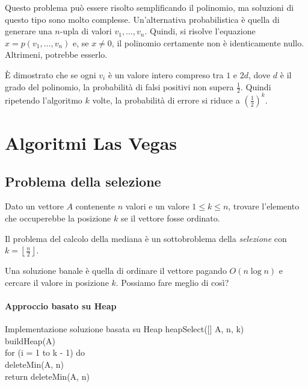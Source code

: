 \noindent
Questo problema può essere risolto semplificando il polinomio, ma soluzioni
di questo tipo sono molto complesse. Un'alternativa probabilistica è quella
di generare una $n$-upla di valori $v_1,\dots,v_n$. Quindi, si risolve
l'equazione $x=p(v_1,\dots,v_n)$ e, se $x\neq 0$, il polinomio certamente
non è identicamente nullo. Altrimeni, potrebbe esserlo.

È dimostrato che se ogni $v_i$ è un valore intero compreso tra $1$ e $2d$,
dove $d$ è il grado del polinomio, la probabilità di falsi positivi non
supera $\frac{1}{2}$. Quindi ripetendo l'algoritmo $k$ volte, la
probabilità di errore si riduce a $\left(\frac{1}{2}\right)^k$.

\section{Algoritmi Las Vegas}
\subsection{Problema della selezione}
\begin{problem}
    Dato un vettore $A$ contenente $n$ valori e un valore $1\leq k\leq n$,
    trovare l'elemento che occuperebbe la posizione $k$ se il vettore fosse
    ordinato.
\end{problem}
\begin{note}
    Il problema del calcolo della mediana è un sottobroblema della
    \emph{selezione} con $k=\left\lfloor\frac{n}{2}\right\rfloor$.
\end{note}

\noindent
Una soluzione banale è quella di ordinare il vettore pagando $O(n\log n)$ e
cercare il valore in posizione $k$. Possiamo fare meglio di così?

\paragraph{Approccio basato su Heap}
\begin{minicode}{Implementazione soluzione basata su Heap}
\ind{} heapSelect([] A,  n,  k)\\
    buildHeap(A)\\
    \indf for (i = 1 to k - 1) do\\
        deleteMin(A, n)\\
    \indf return deleteMin(A, n)
\end{minicode}

